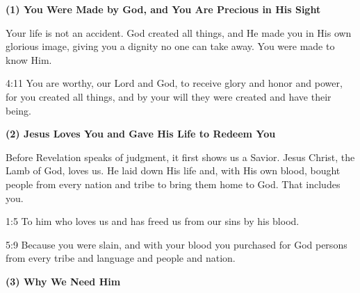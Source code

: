 \clearpage
{}
\begin{center}
\begin{tcolorbox}[
    width=0.95\textwidth,
    colback=GospelCream,
    colframe=GospelMaroon,
    colbacktitle=GospelMaroon,
    coltitle=white,
    title={\small Did you know that Revelation holds the gospel for you?},
    halign title=center,
    fontupper=\small\setstretch{1.0},
    enhanced,
    boxrule=0.8pt,
    arc=2mm,
    breakable,
    left=3pt,
    right=3pt,
    top=6pt,
    bottom=6pt
]

\textbf{(1) You Were Made by God, and You Are Precious in His Sight}

\hspace{0.5cm} Your life is not an accident. God created all things, and He made you in His own glorious image, giving you a dignity no one can take away. You were made to know Him.
\begin{ScriptureBox}
\item[4:11] You are worthy, our Lord and God, to receive glory and honor and power, for you created all things, and by your will they were created and have their being.
\end{ScriptureBox}

\vspace{0.15cm}
\textbf{(2) Jesus Loves You and Gave His Life to Redeem You}

\hspace{0.5cm} Before Revelation speaks of judgment, it first shows us a Savior. Jesus Christ, the Lamb of God, loves us. He laid down His life and, with His own blood, bought people from every nation and tribe to bring them home to God. That includes you.
\begin{ScriptureBox}
\item[1:5] To him who loves us and has freed us from our sins by his blood.
\item[5:9] Because you were slain, and with your blood you purchased for God persons from every tribe and language and people and nation.
\end{ScriptureBox}

\vspace{0.15cm}
\textbf{(3) Why We Need Him}


\end{tcolorbox}
\end{center}
